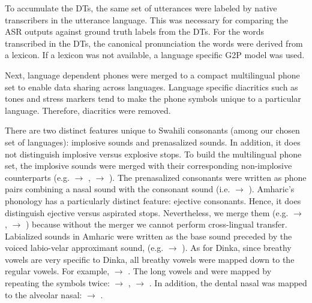 \documentclass[a4paper]{article}
\begin{document}
To accumulate the DTs, the same set of utterances were labeled by native transcribers in the utterance language. This was necessary for comparing the ASR outputs against ground truth labels from the DTs. For the words transcribed in the DTs, the canonical pronunciation the words were derived from a lexicon. If a lexicon was not available, a language specific G2P model was used.

Next, language dependent phones were merged to a compact multilingual phone set to enable data sharing across languages. Language specific diacritics such as tones and stress markers tend to make the phone symbols unique to a particular language. Therefore,  diacritics were removed. 

There are two distinct features unique to Swahili consonants (among our chosen set of languages): implosive sounds and prenasalized sounds.  In addition, it does not distinguish implosive versus explosive stops. To build the multilingual phone set, the implosive sounds were merged with their corresponding non-implosive counterparts (e.g.  $\rightarrow$ ,  $\rightarrow$ ). The prenasalized consonants were written as phone pairs combining a nasal sound with the consonant sound (i.e.  $\rightarrow$  ). Amharic's phonology has a particularly distinct feature: ejective consonants. Hence, it does distinguish ejective versus aspirated stops. Nevertheless, we merge them (e.g.  $\rightarrow$ ,  $\rightarrow$ ) because without the merger we cannot perform cross-lingual transfer. Labialized sounds in Amharic were written as the base sound preceded by the voiced labio-velar approximant sound,  (e.g.  $\rightarrow$  ). As for Dinka, since breathy vowels are very specific to Dinka, all breathy vowels were mapped down to the regular vowels. For example,  $\rightarrow$ . The long vowels  and  were mapped by repeating the symbols twice:  $\rightarrow$ ,  $\rightarrow$ . In addition, the dental nasal was mapped to the alveolar nasal: \textipa{\|[n} $\rightarrow$ . 

\end{document}
